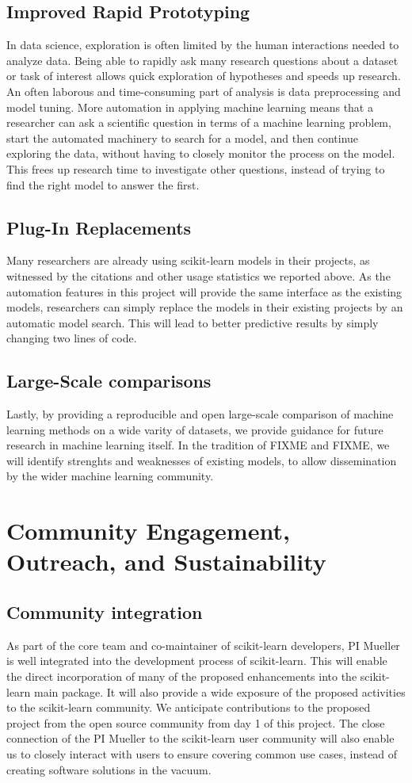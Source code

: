 \subsection{Improved Rapid Prototyping}
In data science, exploration is often limited by the human interactions needed to analyze data.
Being able to rapidly ask many research questions about a dataset or task of interest allows
quick exploration of hypotheses and speeds up research.
An often laborous and time-consuming part of analysis is data preprocessing and model tuning.
More automation in applying machine learning means that a researcher can ask a scientific
question in terms of a machine learning problem, start the automated machinery to
search for a model, and then continue exploring the data, without having to closely monitor
the process on the model. 
This frees up research time to investigate other questions, instead of trying to
find the right model to answer the first.

\subsection{Plug-In Replacements}
Many researchers are already using scikit-learn models in their projects, as witnessed
by the citations and other usage statistics we reported above. As the automation features
in this project will provide the same interface as the existing models, researchers
can simply replace the models in their existing projects by an automatic model search.
This will lead to better predictive results by simply changing two lines of code.

\subsection{Large-Scale comparisons}
Lastly, by providing a reproducible and open large-scale comparison of machine learning
methods on a wide varity of datasets, we provide guidance for future research
in machine learning itself.
In the tradition of FIXME and FIXME, we will identify strenghts and weaknesses of existing
models, to allow dissemination by the wider machine learning community.

\section{Community Engagement, Outreach, and Sustainability}
\subsection{Community integration}
As part of the core team and co-maintainer of scikit-learn developers, PI
Mueller is well integrated into the development process of scikit-learn.
This will enable the direct incorporation of many of the proposed enhancements
into the scikit-learn main package.
It will also provide a wide exposure of the proposed activities to the
scikit-learn community. We anticipate contributions to the proposed
project from the open source community from day 1 of this project.
The close connection of the PI Mueller to the scikit-learn user community will
also enable us to closely interact with users to ensure covering common use cases,
instead of creating software solutions in the vacuum.

